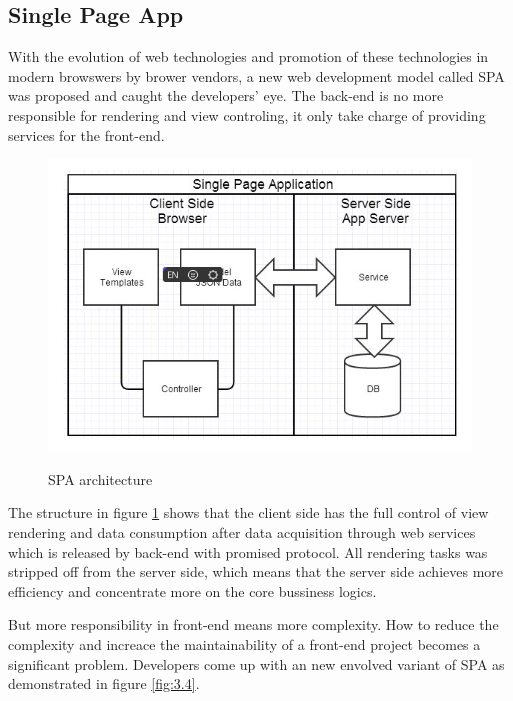\subsection{Single Page App}

With the evolution of web technologies and promotion of these technologies in modern browswers by brower vendors, a new web development model called \gls{SPA} was proposed and caught the developers' eye. The back-end is no more responsible for rendering and view controling, it only take charge of providing services for the front-end.

\begin{figure}[!htbp]
  \caption{SPA architecture}
  \centering
    \includegraphics[width=1\textwidth]{Figures/3_3.png}
  \label{fig:3.3}
\end{figure}

The structure in figure \ref{fig:3.3} shows that the client side has the full control of view rendering and data consumption after data acquisition through web services which is released by back-end with promised protocol. All rendering tasks was stripped off from the server side, which means that the server side achieves more efficiency and concentrate more on the core bussiness logics.

But more responsibility in front-end means more complexity. How to reduce the complexity and increace the maintainability of a front-end project becomes a significant problem. Developers come up with an new envolved variant of SPA as demonstrated in figure \ref{fig:3.4}.

